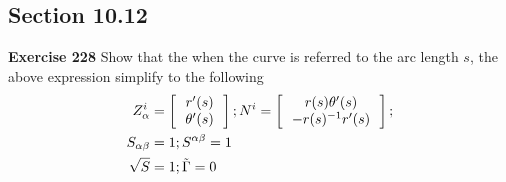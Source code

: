 \documentclass[12pt,a4paper]{report}
\begin{document}
\begin{description}
\section*{Section 10.12}
\item \textbf{Exercise 228} Show that the when the curve is referred to the arc length $s$, the above expression simplify to the following
\begin{align*}
	Z_\alpha^i &= \left [\, \begin{array}{c} r'(s)\\\theta'(s) \end{array}  \,\right ]; N^i = \left [\, \begin{array}{c} r(s)\theta'(s)\\-r(s)^{-1}r'(s) \end{array}  \,\right ];\\
	S_{\alpha\beta}&=1; S^{\alpha\beta}=1\\
	\sqrt{S} &= 1; \tilde{\Gamma} = 0
\end{align*}
\end{description}
\end{document}
